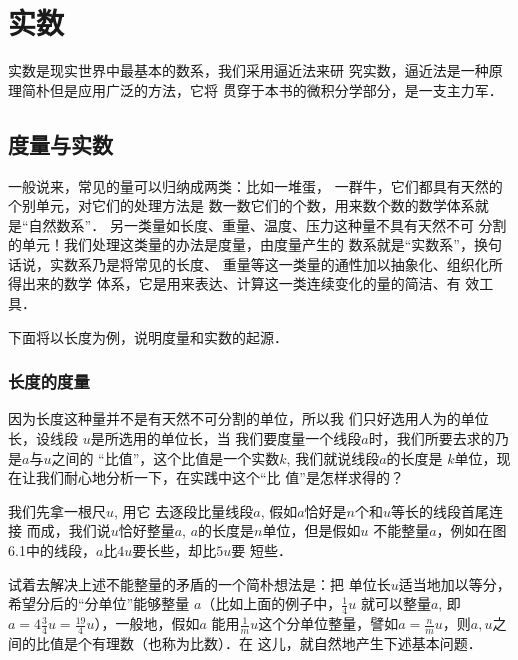 \chapter{实数}
实数是现实世界中最基本的数系，我们采用逼近法来研
究实数，逼近法是一种原理简朴但是应用广泛的方法，它将
贯穿于本书的微积分学部分，是一支主力军．

\section{度量与实数}

一般说来，常见的量可以归纳成两类：比如一堆蛋，
一群牛，它们都具有天然的个别单元，对它们的处理方法是
数一数它们的个数，用来数个数的数学体系就是“自然数系”．
另一类量如长度、重量、温度、压力这种量不具有天然不可
分割的单元！我们处理这类量的办法是度量，由度量产生的
数系就是“实数系”，换句话说，实数系乃是将常见的长度、
重量等这一类量的通性加以抽象化、组织化所得出来的数学
体系，它是用来表达、计算这一类连续变化的量的简洁、有
效工具．

下面将以长度为例，说明度量和实数的起源．

\subsection{长度的度量}
因为长度这种量并不是有天然不可分割的单位，所以我
们只好选用人为的单位长，设线段
$u$是所选用的单位长，当
我们要度量一个线段$a$时，我们所要去求的乃是$a$与$u$之间的
“比值”，这个比值是一个实数$k$, 我们就说线段$a$的长度是
$k$单位，现在让我们耐心地分析一下，在实践中这个“比
值”是怎样求得的？

我们先拿一根尺$u$, 用它 
去逐段比量线段$a$, 假如$a$恰好是$n$个和$u$等长的线段首尾连接
而成，我们说$u$恰好整量$a$, $a$的长度是$n$单位，但是假如$u$
不能整量$a$，例如在图6.1中的线段，$a$比$4u$要长些，却比$5u$要
短些．

\begin{figure}[htp]
    \centering
{}
    \caption{}
\end{figure}


试着去解决上述不能整量的矛盾的一个简朴想法是：把
单位长$u$适当地加以等分，希望分后的“分单位”能够整量
$a$（比如上面的例子中，$\frac{1}{4}u$
就可以整量$a$, 即$a=4\frac{3}{4}u=\frac{19}{4}u$），一般地，假如$a$
能用$\frac{1}{m}u$这个分单位整量，譬如$a=\frac{n}{m}u$，则$a,u$之间的比值是个有理数（也称为比数）．在
这儿，就自然地产生下述基本问题．

